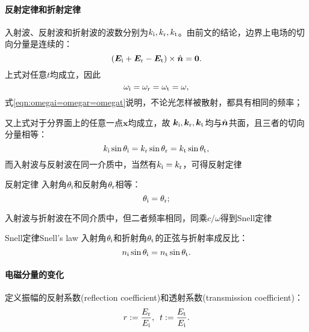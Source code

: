 \paragraph{反射定律和折射定律}
入射波、反射波和折射波的波数分别为$k_{\mathrm{i}},k_\text r,k_\text t$。由前文的结论，边界上电场的切向分量是连续的：
\[
    (\bm E_{\mathrm{i}}+\bm E_\text r-\bm E_\text t)\times\mathop{}\!\hat{\bm{n}}=\bm 0.
\]
上式对任意$t$均成立，因此
\begin{equation}
    \label{eqn:omegai=omegar=omegat}
    \omega_{\mathrm{i}}=\omega_\text r=\omega_\text t=\omega,
\end{equation}
式\eqref{eqn:omegai=omegar=omegat}说明，不论光怎样被散射，都具有相同的频率；

又上式对于分界面上的任意一点$\bm x$均成立，故
$\bm k_{\mathrm{i}},\bm k_\text r,\bm k_\text t$均与$\mathop{}\!\hat{\bm{n}}$共面，且三者的切向分量相等：
\begin{equation}
    k_{\mathrm{i}}\sin\theta_{\mathrm{i}}=k_\text r\sin\theta_\text r=k_\text t\sin\theta_\text t,
\end{equation}
而入射波与反射波在同一介质中，当然有$k_{\mathrm{i}}=k_\text r$，可得反射定律
\begin{theorem}{反射定律}{}
    入射角$\theta_{\mathrm{i}}$和反射角$\theta_\text r$相等：
    \begin{equation}
        \theta_{\mathrm{i}}=\theta_\text r;
    \end{equation}
\end{theorem}
入射波与折射波在不同介质中，但二者频率相同，同乘$c/\omega$得到Snell定律
\begin{theorem}{Snell定律}{Snell's law}
    入射角$\theta_{\mathrm{i}}$和折射角$\theta_\text t$的正弦与折射率成反比：
    \begin{equation}
        \label{eqn:Snell}
        n_{\mathrm{i}}\sin\theta_{\mathrm{i}}=n_\text t\sin\theta_\text t.
    \end{equation}
\end{theorem}

\paragraph{电磁分量的变化}

定义振幅的反射系数(reflection coefficient)和透射系数(transmission coefficient)：
\[
    r:=\frac{E_\text r}{E_{\mathrm{i}}},\enspace t:=\frac{E_\text t}{E_{\mathrm{i}}}.
\]

